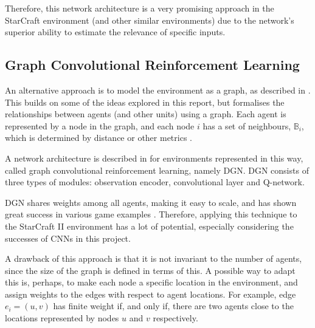 Therefore, this network architecture is a very promising approach in the StarCraft environment (and other similar environments) due to the network's superior ability to estimate the relevance of specific inputs.


\subsection{Graph Convolutional Reinforcement Learning}

An alternative approach is to model the environment as a graph, as described in \cite{graph}. This builds on some of the ideas explored in this report, but formalises the relationships between agents (and other units) using a graph. Each agent is represented by a node in the graph, and each node $i$ has a set of neighbours, $\mathbb{B}_i$, which is determined by distance or other metrics \cite{graph}.

A network architecture is described in \cite{graph} for environments represented in this way, called graph  convolutional reinforcement learning, namely DGN. DGN consists of three types of modules:  observation encoder, convolutional layer and Q-network. 

DGN shares weights among all agents, making it easy to scale, and has shown great success in various game examples \cite{graph}. Therefore, applying this technique to the StarCraft II environment has a lot of potential, especially considering the successes of CNNs in this project. 

A drawback of this approach is that it is not invariant to the number of agents, since the size of the graph is defined in terms of this. A possible way to adapt this is, perhaps, to make each node a specific location in the environment, and assign weights to the edges with respect to agent locations. For example, edge $e_i = (u,v)$ has finite weight if, and only if, there are two agents close to the locations represented by nodes $u$ and $v$ respectively.



